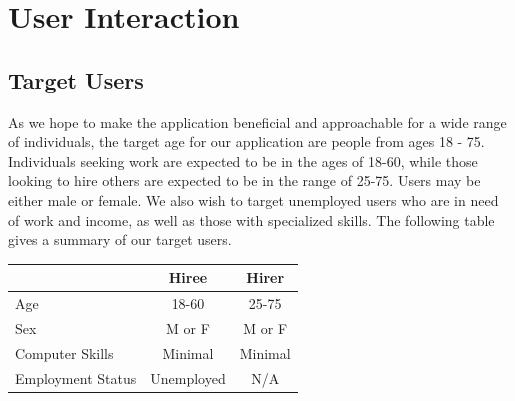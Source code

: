 \documentclass[11pt]{article}
\begin{document}
%
\section{User Interaction}\label{user-interaction}

\subsection{Target Users}

As we hope to make the application beneficial and approachable for a wide range of individuals, the target age for our application are people from ages 18 - 75. Individuals seeking work are expected to be in the ages of 18-60, while those looking to hire others are expected to be in the range of 25-75. Users may be either male or female. We also wish to target unemployed users who are in need of work and income, as well as those with  specialized skills. The following table gives a summary of our target users.

\begin{center}
  \begin{tabular}{| l | c | c |}
  \hline
    & Hiree & Hirer \\ \hline
    Age & 18-60 & 25-75 \\ \hline
    Sex & M or F & M or F \\ \hline
    Computer Skills & Minimal & Minimal \\ \hline
    Employment Status & Unemployed & N/A\\
    \hline
  \end{tabular}
\end{center}
\end{document}
